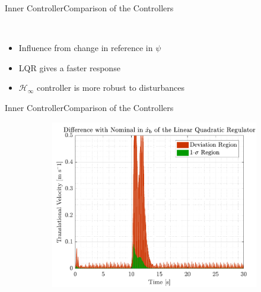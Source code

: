 \begin{frame}{Inner Controller}{Comparison of the Controllers}
\begin{figure}[H]
\begin{minipage}{0.45\linewidth}
\begin{figure}[H]
    \end{figure}                
  \end{minipage}\hfill \\
\end{figure}
\begin{itemize}
    \item Influence from change in reference in $\psi$
    \item LQR gives a faster response
    \item $\mathcal{H}_\infty$ controller is more robust to disturbances
\end{itemize}
\end{frame}


\begin{frame}{Inner Controller}{Comparison of the Controllers}
  \begin{figure}[H]
    \begin{minipage}{0.45\linewidth}
      \begin{figure}[H]
        \centering
        \includegraphics[width=1\linewidth]{figures/xbdot_mc_lqr_error}
      \end{figure}        
    \end{minipage}\hfill      
    \begin{minipage}{0.45\linewidth}
      \begin{figure}[H]
        \centering

\end{figure}
\end{minipage}
\end{figure}
\end{frame}
